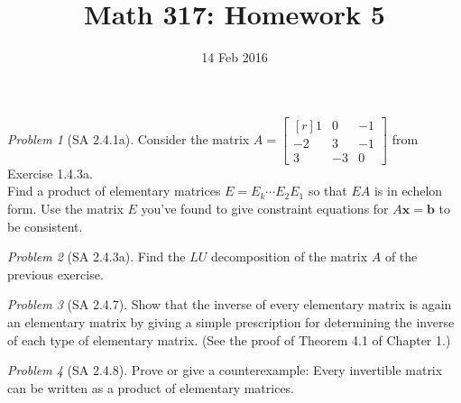 \documentclass[fleqn,11pt]{paper}
\title{Math 317: Homework 5}
\date{14 Feb 2016}
\theoremstyle{remark}
\newtheorem{problem}{Problem}
\renewcommand{\vec}[1]{\mathbf{#1}}
\newcommand{\<}{\ensuremath{\langle}}
\renewcommand{\>}{\ensuremath{\rangle}}
\newcommand\vb{\vec{b}}
\newcommand\vx{\vec{x}}
\begin{document}
\maketitle

\begin{problem}[SA 2.4.1a]
Consider the matrix 
$A = \begin{bmatrix*}[r] 1 & 0&-1 \\ -2&3 &-1 \\3&-3 &0 \end{bmatrix*}$
from Exercise 1.4.3a.\\[6pt]
Find a product of elementary matrices $E = E_k \cdots E_2 E_1$
so that $EA$ is in echelon form. Use the matrix $E$ you've found to give
constraint equations for $A\vx = \vb$ to be consistent.
\end{problem}

\probskip

\begin{problem}[SA 2.4.3a]
Find the $LU$ decomposition of the matrix $A$ of the previous exercise.
\end{problem}

\probskip



\begin{problem}[SA 2.4.7]
Show that the inverse of every elementary matrix is again an elementary matrix
by giving a simple prescription for determining the inverse of each type of
elementary matrix. (See the proof of Theorem 4.1 of Chapter 1.)
\end{problem}

\probskip

\begin{problem}[SA 2.4.8]
Prove or give a counterexample: Every invertible matrix can be written as a
product of elementary matrices.
\end{problem}
\end{document}
